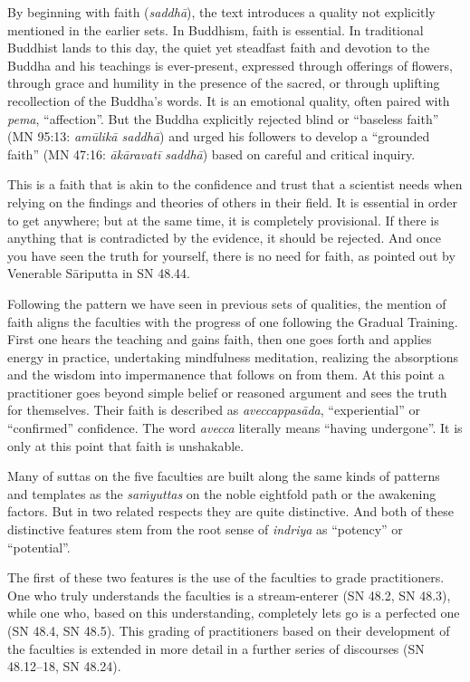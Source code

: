 \documentclass[12pt,openany]{book}%
\begin{document}
By beginning with faith (\textit{\textsanskrit{saddhā}}), the text introduces a quality not explicitly mentioned in the earlier sets. In Buddhism, faith is essential. In traditional Buddhist lands to this day, the quiet yet steadfast faith and devotion to the Buddha and his teachings is ever-present, expressed through offerings of flowers, through grace and humility in the presence of the sacred, or through uplifting recollection of the Buddha’s words. It is an emotional quality, often paired with \textit{pema}, “affection”. But the Buddha explicitly rejected blind or “baseless faith” (MN 95:13: \textit{\textsanskrit{amūlikā} \textsanskrit{saddhā}}) and urged his followers to develop a “grounded faith” (MN 47:16: \textit{\textsanskrit{ākāravatī} \textsanskrit{saddhā}}) based on careful and critical inquiry.

This is a faith that is akin to the confidence and trust that a scientist needs when relying on the findings and theories of others in their field. It is essential in order to get anywhere; but at the same time, it is completely provisional. If there is anything that is contradicted by the evidence, it should be rejected. And once you have seen the truth for yourself, there is no need for faith, as pointed out by Venerable \textsanskrit{Sāriputta} in SN 48.44.

Following the pattern we have seen in previous sets of qualities, the mention of faith aligns the faculties with the progress of one following the Gradual Training. First one hears the teaching and gains faith, then one goes forth and applies energy in practice, undertaking mindfulness meditation, realizing the absorptions and the wisdom into impermanence that follows on from them. At this point a practitioner goes beyond simple belief or reasoned argument and sees the truth for themselves. Their faith is described as \textit{\textsanskrit{aveccappasāda}}, “experiential” or “confirmed” confidence. The word \textit{avecca} literally means “having undergone”. It is only at this point that faith is unshakable.

Many of suttas on the five faculties are built along the same kinds of patterns and templates as the \textit{\textsanskrit{saṁyuttas}} on the noble eightfold path or the awakening factors. But in two related respects they are quite distinctive. And both of these distinctive features stem from the root sense of \textit{indriya} as “potency” or “potential”.

The first of these two features is the use of the faculties to grade practitioners. One who truly understands the faculties is a stream-enterer (SN 48.2, SN 48.3), while one who, based on this understanding, completely lets go is a perfected one (SN 48.4, SN 48.5). This grading of practitioners based on their development of the faculties is extended in more detail in a further series of discourses (SN 48.12–18, SN 48.24).
\end{document}
